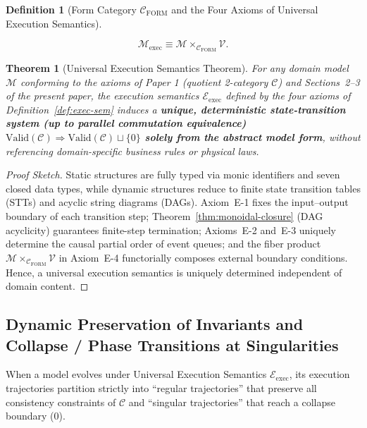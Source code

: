 \documentclass[11pt,a4paper]{article}
\theoremstyle{definition}
\newtheorem{definition}{Definition}[section]
\theoremstyle{plain}
\newtheorem{theorem}{Theorem}[section]
\theoremstyle{remark}
\newcommand{\Valid}{\mathrm{Valid}}
\newcommand{\Cform}{\mathcal{C}_{\mathrm{FORM}}}
\begin{document}
\begin{definition}[Form Category $\Cform$ and the Four Axioms of Universal Execution Semantics]
\begin{enumerate}
    \begin{equation}
    \mathcal{M}_{\mathrm{exec}} \equiv \mathcal{M} \times_{\Cform} \mathcal{V}.
    \end{equation}
\end{enumerate}
\end{definition}

\begin{theorem}[Universal Execution Semantics Theorem]\label{thm:univ-exec}
For any domain model $\mathcal{M}$ conforming to the axioms of Paper 1 (quotient 2-category $\mathcal{C}$) and Sections~2--3 of the present paper, the execution semantics $\mathcal{E}_{\mathrm{exec}}$ defined by the four axioms of Definition~\ref{def:exec-sem} induces a \textbf{unique, deterministic state-transition system (up to parallel commutation equivalence) $\Valid(\mathcal{C}) \Rightarrow \Valid(\mathcal{C}) \sqcup \{0\}$ solely from the abstract model form}, without referencing domain-specific business rules or physical laws.
\end{theorem}

\begin{proof}[Proof Sketch]
Static structures are fully typed via monic identifiers and seven closed data types, while dynamic structures reduce to finite state transition tables (STTs) and acyclic string diagrams (DAGs). Axiom~E-1 fixes the input--output boundary of each transition step; Theorem~\ref{thm:monoidal-closure} (DAG acyclicity) guarantees finite-step termination; Axioms~E-2 and~E-3 uniquely determine the causal partial order of event queues; and the fiber product $\mathcal{M} \times_{\Cform} \mathcal{V}$ in Axiom~E-4 functorially composes external boundary conditions. Hence, a universal execution semantics is uniquely determined independent of domain content.
\end{proof}

\subsection{Dynamic Preservation of Invariants and Collapse / Phase Transitions at Singularities}
When a model evolves under Universal Execution Semantics $\mathcal{E}_{\mathrm{exec}}$, its execution trajectories partition strictly into ``regular trajectories'' that preserve all consistency constraints of $\mathcal{C}$ and ``singular trajectories'' that reach a collapse boundary ($0$).
\end{document}
